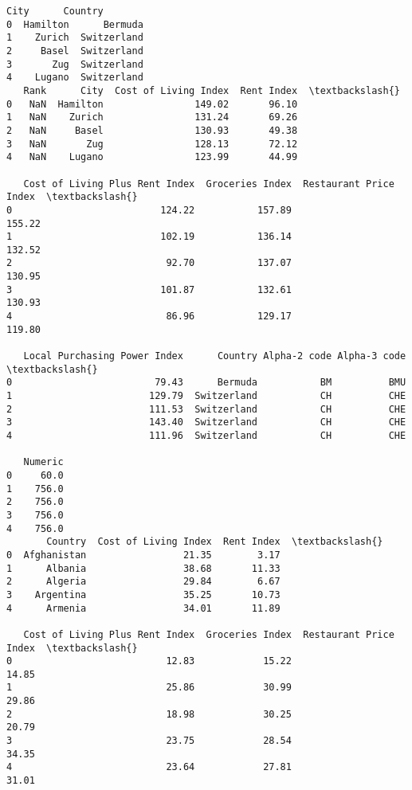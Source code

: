 \documentclass[11pt]{article}
\begin{document}
    \begin{Verbatim}[commandchars=\\\{\}]
       City      Country
0  Hamilton      Bermuda
1    Zurich  Switzerland
2     Basel  Switzerland
3       Zug  Switzerland
4    Lugano  Switzerland
   Rank      City  Cost of Living Index  Rent Index  \textbackslash{}
0   NaN  Hamilton                149.02       96.10
1   NaN    Zurich                131.24       69.26
2   NaN     Basel                130.93       49.38
3   NaN       Zug                128.13       72.12
4   NaN    Lugano                123.99       44.99

   Cost of Living Plus Rent Index  Groceries Index  Restaurant Price Index  \textbackslash{}
0                          124.22           157.89                  155.22
1                          102.19           136.14                  132.52
2                           92.70           137.07                  130.95
3                          101.87           132.61                  130.93
4                           86.96           129.17                  119.80

   Local Purchasing Power Index      Country Alpha-2 code Alpha-3 code  \textbackslash{}
0                         79.43      Bermuda           BM          BMU
1                        129.79  Switzerland           CH          CHE
2                        111.53  Switzerland           CH          CHE
3                        143.40  Switzerland           CH          CHE
4                        111.96  Switzerland           CH          CHE

   Numeric
0     60.0
1    756.0
2    756.0
3    756.0
4    756.0
       Country  Cost of Living Index  Rent Index  \textbackslash{}
0  Afghanistan                 21.35        3.17
1      Albania                 38.68       11.33
2      Algeria                 29.84        6.67
3    Argentina                 35.25       10.73
4      Armenia                 34.01       11.89

   Cost of Living Plus Rent Index  Groceries Index  Restaurant Price Index  \textbackslash{}
0                           12.83            15.22                   14.85
1                           25.86            30.99                   29.86
2                           18.98            30.25                   20.79
3                           23.75            28.54                   34.35
4                           23.64            27.81                   31.01


\end{Verbatim}
\end{document}
